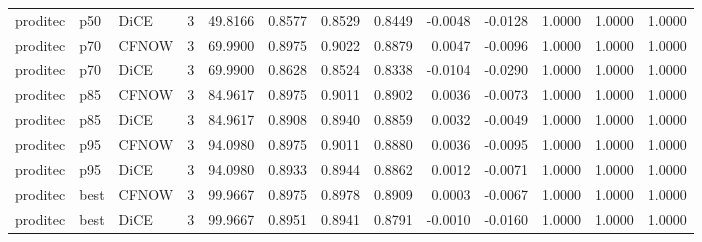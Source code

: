 \begin{tabular}{lllrrrrrrrrrr}
proditec &    p50 &   DiCE &  3 &        49.8166 &     0.8577 &  0.8529 &   0.8449 &  -0.0048 &   -0.0128 &                  1.0000 &                   1.0000 &              1.0000 \\
proditec &    p70 &  CFNOW &  3 &        69.9900 &     0.8975 &  0.9022 &   0.8879 &   0.0047 &   -0.0096 &                  1.0000 &                   1.0000 &              1.0000 \\
proditec &    p70 &   DiCE &  3 &        69.9900 &     0.8628 &  0.8524 &   0.8338 &  -0.0104 &   -0.0290 &                  1.0000 &                   1.0000 &              1.0000 \\
proditec &    p85 &  CFNOW &  3 &        84.9617 &     0.8975 &  0.9011 &   0.8902 &   0.0036 &   -0.0073 &                  1.0000 &                   1.0000 &              1.0000 \\
proditec &    p85 &   DiCE &  3 &        84.9617 &     0.8908 &  0.8940 &   0.8859 &   0.0032 &   -0.0049 &                  1.0000 &                   1.0000 &              1.0000 \\
proditec &    p95 &  CFNOW &  3 &        94.0980 &     0.8975 &  0.9011 &   0.8880 &   0.0036 &   -0.0095 &                  1.0000 &                   1.0000 &              1.0000 \\
proditec &    p95 &   DiCE &  3 &        94.0980 &     0.8933 &  0.8944 &   0.8862 &   0.0012 &   -0.0071 &                  1.0000 &                   1.0000 &              1.0000 \\
proditec &   best &  CFNOW &  3 &        99.9667 &     0.8975 &  0.8978 &   0.8909 &   0.0003 &   -0.0067 &                  1.0000 &                   1.0000 &              1.0000 \\
proditec &   best &   DiCE &  3 &        99.9667 &     0.8951 &  0.8941 &   0.8791 &  -0.0010 &   -0.0160 &                  1.0000 &                   1.0000 &              1.0000 \\
\bottomrule
\end{tabular}
